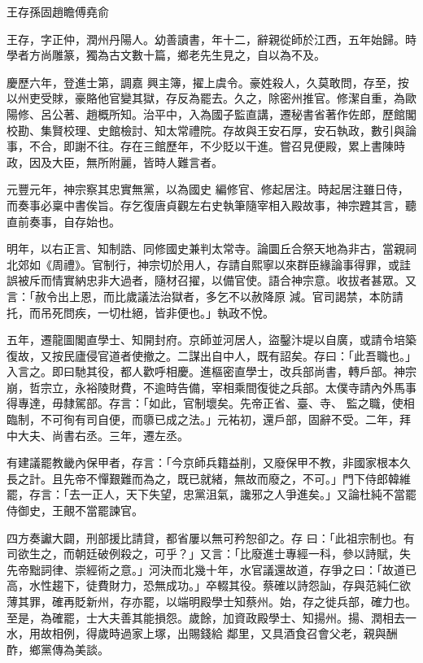 
\begin{pinyinscope}

 王存孫固趙瞻傅堯俞



 王存，字正仲，潤州丹陽人。幼善讀書，年十二，辭親從師於江西，五年始歸。時學者方尚雕篆，獨為古文數十篇，鄉老先生見之，自以為不及。



 慶歷六年，登進士第，調嘉
 興主簿，擢上虞令。豪姓殺人，久莫敢問，存至，按以州吏受賕，豪賂他官變其獄，存反為罷去。久之，除密州推官。修潔自重，為歐陽修、呂公著、趙概所知。治平中，入為國子監直講，遷秘書省著作佐郎，歷館閣校勘、集賢校理、史館檢討、知太常禮院。存故與王安石厚，安石執政，數引與論事，不合，即謝不往。存在三館歷年，不少貶以干進。嘗召見便殿，累上書陳時政，因及大臣，無所附麗，皆時人難言者。



 元豐元年，神宗察其忠實無黨，以為國史
 編修官、修起居注。時起居注雖日侍，而奏事必稟中書俟旨。存乞復唐貞觀左右史執筆隨宰相入殿故事，神宗韙其言，聽直前奏事，自存始也。



 明年，以右正言、知制誥、同修國史兼判太常寺。論圜丘合祭天地為非古，當親祠北郊如《周禮》。官制行，神宗切於用人，存請自熙寧以來群臣緣論事得罪，或詿誤被斥而情實納忠非大過者，隨材召擢，以備官使。語合神宗意。收拔者甚眾。又言：「赦令出上恩，而比歲議法治獄者，多乞不以赦降原
 減。官司謁禁，本防請托，而吊死問疾，一切杜絕，皆非便也。」執政不悅。



 五年，遷龍圖閣直學士、知開封府。京師並河居人，盜鑿汴堤以自廣，或請令培築復故，又按民廬侵官道者使撤之。二謀出自中人，既有詔矣。存曰：「此吾職也。」入言之。即曰馳其役，都人歡呼相慶。進樞密直學士，改兵部尚書，轉戶部。神宗崩，哲宗立，永裕陵財費，不逾時告備，宰相乘間復徙之兵部。太僕寺請內外馬事得專達，毋隸駕部。存言：「如此，官制壞矣。先帝正省、臺、寺、
 監之職，使相臨制，不可徇有司自便，而隳已成之法。」元祐初，還戶部，固辭不受。二年，拜中大夫、尚書右丞。三年，遷左丞。



 有建議罷教畿內保甲者，存言：「今京師兵籍益削，又廢保甲不教，非國家根本久長之計。且先帝不憚艱難而為之，既已就緒，無故而廢之，不可。」門下侍郎韓維罷，存言：「去一正人，天下失望，忠黨沮氣，讒邪之人爭進矣。」又論杜純不當罷侍御史，王覿不當罷諫官。



 四方奏讞大闢，刑部援比請貸，都省屢以無可矜恕卻之。存
 曰：「此祖宗制也。有司欲生之，而朝廷破例殺之，可乎？」又言：「比廢進士專經一科，參以詩賦，失先帝黜詞律、崇經術之意。」河決而北幾十年，水官議還故道，存爭之曰：「故道已高，水性趨下，徒費財力，恐無成功。」卒輟其役。蔡確以詩怨訕，存與范純仁欲薄其罪，確再貶新州，存亦罷，以端明殿學士知蔡州。始，存之徙兵部，確力也。至是，為確罷，士大夫善其能損怨。歲餘，加資政殿學士、知揚州。揚、潤相去一水，用故相例，得歲時過家上塚，出賜錢給
 鄰里，又具酒食召會父老，親與酬酢，鄉黨傳為美談。




\end{pinyinscope}
